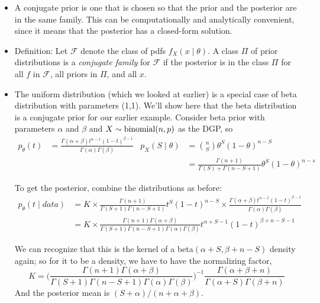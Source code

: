 \begin{itemize}[leftmargin=0pt]

\item A conjugate prior is one that is chosen so that the prior and
  the posterior are in the same family.  This can be computationally
  and analytically convenient, since it means that the posterior has a
  closed-form solution.

\item Definition: \citep[From][7.2.3]{CB02} Let $\mathcal{F}$
  denote the class of pdfs $f_X(x \mid \theta)$.  A class $\Pi$ of prior
  distributions is a \emph{conjugate family} for $\mathcal F$ if the
  posterior is in the class $\Pi$ for all $f$ in $\mathcal F$, all
  priors in $\Pi$, and all $x$.

\item The uniform distribution (which we looked at earlier) is a
  special case of beta distribution with parameters (1,1).  We'll show
  here that the beta distribution is a conjugate prior for our earlier
  example.  Consider beta prior with parameters $\alpha$ and $\beta$ and $X \sim
  \operatorname{binomial}(n,p)$ as the DGP, so
  \begin{align*}
    p_\theta(t)      &= \frac{\Gamma(\alpha + \beta) t^{\alpha-1} (1-t)^{\beta-1}}{\Gamma(\alpha) \Gamma(\beta)}&
    p_{X}(S \mid \theta) &= \binom{n}{S} \theta^S (1-\theta)^{n-S} \\ 
    &&          &= \frac{\Gamma(n + 1)}{\Gamma(S) + \Gamma(n - S + 1)} \theta^S (1-\theta)^{n-s}
  \end{align*}
  
  To get the posterior, combine the distributions as before:
  \begin{align*}
    p_\theta(t \mid data)
    &= K \times \frac{\Gamma(n + 1)}{\Gamma(S + 1) \Gamma(n - S + 1)}
       t^S (1-t)^{n-S} \times \frac{\Gamma(\alpha + \beta) t^{\alpha-1} (1-t)^{\beta-1}}{\Gamma(\alpha) \Gamma(\beta)} \\
    &= K \times \frac{\Gamma(n + 1) \Gamma(\alpha + \beta)}{\Gamma(S + 1) \Gamma(n - S + 1) \Gamma(\alpha) \Gamma(\beta)}
       t^{\alpha + S - 1} (1 - t)^{\beta + n - S - 1}
  \end{align*}

  We can recognize that this is the kernel of a beta$(\alpha+S, \beta+n-S)$
  density again; so for it to be a density, we have to have the
  normalizing factor,
  \begin{equation*}
    K = \Big(\frac{\Gamma(n + 1) \Gamma(\alpha + \beta)}{\Gamma(S + 1) \Gamma(n - S +1)\Gamma(\alpha)\Gamma(\beta)}\Big)^{-1}
        \frac{\Gamma(\alpha + \beta + n)}{\Gamma(\alpha + S)\Gamma(\beta + n)}
  \end{equation*}
  And the posterior mean is $(S + \alpha) / (n + \alpha + \beta)$.


\end{itemize}
